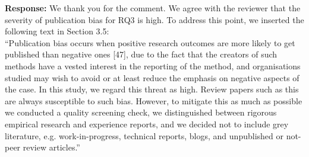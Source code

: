 \documentclass[a4paper,twoside,11pt]{reviewresponse}
\begin{document}
\textbf{Response:}
We thank you for the comment. We agree with the reviewer that the severity of publication bias for RQ3 is high. To address this point, we inserted the following text in Section 3.5: \\
``Publication bias occurs when positive research outcomes are more likely to get published than negative ones [47], due to the fact that the creators of such methods have a vested interest in the reporting of the method, and organisations studied may wish to avoid or at least reduce the emphasis on negative aspects of the case. In this study, we regard this threat as high. Review papers such as this are always susceptible to such bias. However, to mitigate this as much as possible we conducted a quality screening check, we distinguished between rigorous empirical research and experience reports, and we decided not to include grey literature, e.g. work-in-progress, technical reports, blogs, and unpublished or not-peer review articles.''
\end{document}
